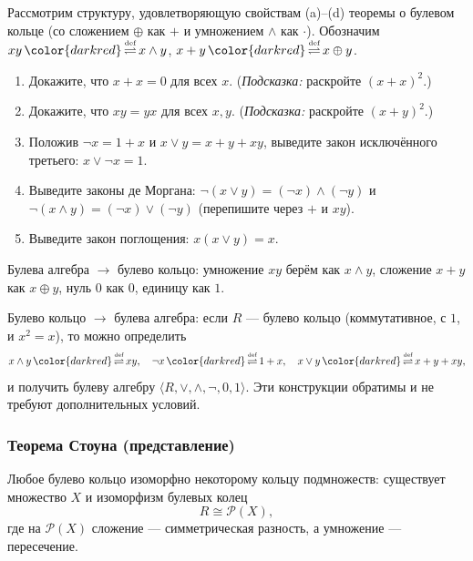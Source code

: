 \documentclass[11pt, a4paper]{extarticle}
\renewcommand{\eqdef}{\ifmmode{\,\color{darkred}\mathop{\overset{\text{\tiny def}}{\rightleftharpoons}}\,}\fi}%
\newcommand{\eqdef}{\,\mathop{\color{darkred}\overset{\text{\tiny def}}{\rightleftharpoons}}\,}
\begin{document}
\begin{exercise}
Рассмотрим структуру, удовлетворяющую свойствам (a)--(d) теоремы о булевом кольце (со сложением $\oplus$ как $+$ и умножением $\wedge$ как $\cdot$). Обозначим $xy \eqdef x\wedge y$, $x+y \eqdef x\oplus y$.
\begin{enumerate}
    \item Докажите, что $x+x=0$ для всех $x$. (\textit{Подсказка:} раскройте $(x+x)^2$.)
    \item Докажите, что $xy=yx$ для всех $x,y$. (\textit{Подсказка:} раскройте $(x+y)^2$.)
    \item Положив $\neg x = 1+x$ и $x\vee y = x+y+xy$, выведите закон исключённого третьего: $x \vee \neg x = 1$.
    \item Выведите законы де Моргана: $\neg(x\vee y) = (\neg x)\wedge(\neg y)$ и $\neg(x\wedge y) = (\neg x)\vee(\neg y)$ (перепишите через $+$ и $xy$).
    \item Выведите закон поглощения: $x(x\vee y)=x$.
\end{enumerate}
\end{exercise}

\begin{remark}
Булева алгебра $\to$ булево кольцо: умножение $xy$ берём как $x\wedge y$, сложение $x+y$ как $x\oplus y$, нуль $0$ как $0$, единицу как $1$.

Булево кольцо $\to$ булева алгебра: если $R$ --- булево кольцо (коммутативное, с $1$, и $x^2=x$), то можно определить
$$
x\wedge y \eqdef xy,\quad
\neg x \eqdef 1 + x,\quad
x\vee y \eqdef x + y + xy,
$$
и получить булеву алгебру $\langle R, \vee, \wedge, \neg, 0, 1\rangle$.
Эти конструкции обратимы и не требуют дополнительных условий.
\end{remark}

\subsubsection{Теорема Стоуна (представление)}

\begin{theorem}
Любое булево кольцо изоморфно некоторому кольцу подмножеств: существует множество $X$ и изоморфизм булевых колец
$$
R \cong \mathcal{P}(X),
$$
где на $\mathcal{P}(X)$ сложение --- симметрическая разность, а умножение --- пересечение.
\end{theorem}
\end{document}
